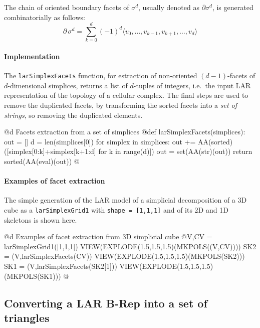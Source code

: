 \documentclass[11pt,oneside]{article}	%
\begin{document}
The chain of oriented boundary facets of $\sigma^d$, usually denoted as $\partial \sigma^d$, is generated combinatorially as follows:
\[
\partial\, \sigma^d = \sum_{k=0}^d (-1)^d \langle v_0, \ldots, v_{k-1}, v_{k+1}, \ldots, v_d \rangle
\]

\paragraph{Implementation}

The \texttt{larSimplexFacets} function, for estraction of non-oriented $(d-1)$-facets of $d$-dimensional simplices, returns a list of $d$-tuples of integers, i.e.~the input LAR representation of the topology of a cellular complex. The final steps are used to remove the duplicated facets, by transforming the sorted facets into a \emph{set of strings}, so removing the duplicated elements.
        
@d Facets extraction from a set of simplices
@{def larSimplexFacets(simplices):
    out = []
    d = len(simplices[0])
    for simplex in simplices:
        out += AA(sorted)([simplex[0:k]+simplex[k+1:d] for k in range(d)])
    out = set(AA(str)(out))
    return  sorted(AA(eval)(out))
@}

\paragraph{Examples of facet extraction}
The simple generation of the LAR model of a simplicial decomposition of a 3D cube as a \texttt{larSimplexGrid1} with \texttt{shape = [1,1,1]} and of its 2D and 1D skeletons is shown here.

@d Examples of facet extraction from 3D simplicial cube
@{V,CV = larSimplexGrid1([1,1,1])
VIEW(EXPLODE(1.5,1.5,1.5)(MKPOLS((V,CV))))
SK2 = (V,larSimplexFacets(CV))
VIEW(EXPLODE(1.5,1.5,1.5)(MKPOLS(SK2)))
SK1 = (V,larSimplexFacets(SK2[1]))
VIEW(EXPLODE(1.5,1.5,1.5)(MKPOLS(SK1)))
@}



\subsection{Converting a LAR B-Rep into a set of triangles}
\end{document}
